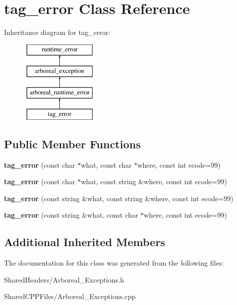 \hypertarget{classtag__error}{}\section{tag\+\_\+error Class Reference}
\label{classtag__error}
Inheritance diagram for tag\+\_\+error\+:\begin{figure}[H]
\begin{center}
\leavevmode
\includegraphics[height=4.000000cm]{classtag__error}
\end{center}
\end{figure}
\subsection*{Public Member Functions}
\begin{DoxyCompactItemize}
\item 
\mbox{\label{classtag__error_a49b7eb59916bbc065f7d79bbf31cb460}} 
{\bfseries tag\+\_\+error} (const char $\ast$what, const char $\ast$where, const int ecode=99)
\item 
\mbox{\label{classtag__error_abc7794a3cf421776f77b781b4bef9dfb}} 
{\bfseries tag\+\_\+error} (const char $\ast$what, const string \&where, const int ecode=99)
\item 
\mbox{\label{classtag__error_afc103fa30ef508088c2cb4eda60837d2}} 
{\bfseries tag\+\_\+error} (const string \&what, const string \&where, const int ecode=99)
\item 
\mbox{\label{classtag__error_a70a4e7f9da04ca034f23e42ce1e95433}} 
{\bfseries tag\+\_\+error} (const string \&what, const char $\ast$where, const int ecode=99)
\end{DoxyCompactItemize}
\subsection*{Additional Inherited Members}


The documentation for this class was generated from the following files\+:\begin{DoxyCompactItemize}
\item 
Shared\+Headers/Arboreal\+\_\+\+Exceptions.\+h\item 
Shared\+C\+P\+P\+Files/Arboreal\+\_\+\+Exceptions.\+cpp\end{DoxyCompactItemize}
